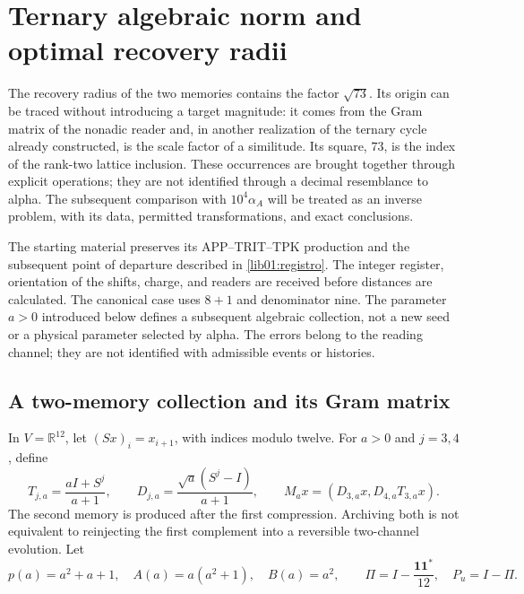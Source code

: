 \section{Ternary algebraic norm and optimal recovery radii}
\label{lib02:norma-ternaria}

The recovery radius of the two memories contains the factor \(\sqrt{73}\). Its origin can be traced without introducing a target magnitude: it comes from the Gram matrix of the nonadic reader and, in another realization of the ternary cycle already constructed, is the scale factor of a similitude. Its square, \(73\), is the index of the rank-two lattice inclusion. These occurrences are brought together through explicit operations; they are not identified through a decimal resemblance to alpha. The subsequent comparison with \(10^4\alpha_A\) will be treated as an inverse problem, with its data, permitted transformations, and exact conclusions.

The starting material preserves its APP--TRIT--TPK production and the subsequent point of departure described in \cref{lib01:registro}. The integer register, orientation of the shifts, charge, and readers are received before distances are calculated. The canonical case uses \(8+1\) and denominator nine. The parameter \(a>0\) introduced below defines a subsequent algebraic collection, not a new seed or a physical parameter selected by alpha. The errors belong to the reading channel; they are not identified with admissible events or histories.

\subsection{A two-memory collection and its Gram matrix}
\label{lib02:familia-memoria}

In \(V=\mathbb R^{12}\), let \((Sx)_i=x_{i+1}\), with indices modulo twelve. For \(a>0\) and \(j=3,4\), define
\begin{equation}
 T_{j,a}=\frac{aI+S^j}{a+1},\qquad
 D_{j,a}=\frac{\sqrt a(S^j-I)}{a+1},\qquad
 M_ax=(D_{3,a}x,D_{4,a}T_{3,a}x).
 \label{lib02:lectores}
\end{equation}
The second memory is produced after the first compression. Archiving both is not equivalent to reinjecting the first complement into a reversible two-channel evolution. Let
\[
 p(a)=a^2+a+1,\quad A(a)=a(a^2+1),\quad B(a)=a^2,
 \qquad\Pi=I-\frac{\mathbf1\mathbf1^*}{12},\quad P_u=I-\Pi.
\]

